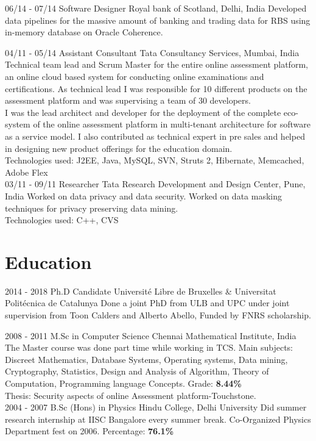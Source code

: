 \documentclass[]{friggeri-cv}
\begin{document}
	\begin{entrylist}
	\entry
	{06/14 - 07/14}
	{Software Designer}
	{Royal bank of Scotland, Delhi, India}
	{Developed data pipelines for the massive amount of banking and trading data for RBS using in-memory database on Oracle Coherence. \\}

	\entry
	{04/11 - 05/14}
	{Assistant Consultant}
	{Tata Consultancy Services, Mumbai, India}
	{Technical team lead and Scrum Master for the entire online assessment platform, an online cloud based system for conducting online examinations and certifications. As technical lead I was responsible for 10 different products on the assessment platform and was supervising a team of 30 developers.\\
		I was the lead architect and developer for the deployment of the complete eco-system of the online assessment platform in multi-tenant architecture for software as a service model. I also contributed as technical expert in pre sales and helped in designing new product offerings for the education domain. \\
		Technologies used: J2EE, Java, MySQL, SVN, Struts 2, Hibernate, Memcached, Adobe Flex\\
	}
	\entry
	{03/11 - 09/11}
	{Researcher}
	{Tata Research Development and Design Center, Pune, India}
	{Worked on data privacy and data security. Worked on data masking techniques for privacy preserving data mining. \\
		Technologies used: C++, CVS\\}
	\end{entrylist}
	
	\section{Education}
	\begin{entrylist}
		 \entry
		{2014 - 2018}
		{Ph.D Candidate}
		{Universit\'{e} Libre de Bruxelles \&  Universitat Polit\'{e}cnica de Catalunya}
		{Done a joint PhD from ULB and UPC under joint supervision from Toon Calders and Alberto Abello, Funded by FNRS scholarship.\\}
		
		\entry
		{2008 - 2011}
		{M.Sc in Computer Science}
		{Chennai Mathematical Institute, India}
		{The Master course was done part time while working in TCS.
			Main subjects: Discreet Mathematics, Database Systems, Operating systems, Data mining, Cryptography, Statistics, Design and Analysis of Algorithm,
			Theory of Computation, Programming language Concepts. Grade: \textbf{8.44\%}\\
			Thesis: Security aspects of online Assessment platform-Touchstone.\\}
		\entry
		{2004 - 2007}
		{B.Sc (Hons) in Physics}
		{Hindu College, Delhi University}
		{Did summer research internship at IISC Bangalore every summer break. Co-Organized Physics Department fest on 2006.
			Percentage: \textbf{76.1\%}\\}
	\end{entrylist}
	
\end{document}
